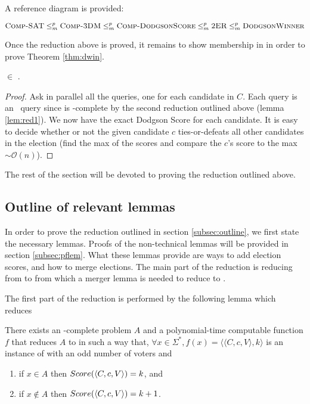 A reference diagram is provided:

\[\text{{\sc Comp-SAT}} \le_m^p \text{{\sc Comp-3DM}} \le_m^p
\text{{\sc Comp-DodgsonScore}} \le_m^p
\text{{\sc 2ER}} \le_m^p \text{{\sc DodgsonWinner}}\]

Once the reduction above is proved, it remains to show membership in \tp in order
to prove Theorem \ref{thm:dwin}.
\begin{theorem} \label{thm:intp}
     $\in$ \tp. \\
\end{theorem}
\begin{proof}
    Ask in parallel all the  queries,
    one for each candidate in $C$.
    Each query is an \np~query since  is \np-complete by
    the second reduction outlined above (lemma \ref{lem:red1}).
    We now have the exact Dodgson Score for each candidate.
    It is easy to decide
    whether or not the given candidate $c$ ties-or-defeats all other candidates in
    the election (find the max of the scores and compare the $c$'s score to
    the max $\sim\mathcal{O}(n)$).
\end{proof}

The rest of the section will be devoted to proving the reduction outlined above.

\subsection{Outline of relevant lemmas}

In order to prove the reduction outlined in section \ref{subsec:outline},
we first state the necessary lemmas.
Proofs of the non-technical lemmas will be provided in section \ref{subsec:pflem}.
What these lemmas provide are ways to add election scores, and how to merge elections.
The main part of the reduction is reducing from \csat to 
from which a merger lemma is needed to reduce to \dwin.

The first part of the reduction is performed by the following lemma which
reduces 

\begin{lemma} \label{lem:red1}
    There exists an \np-complete problem $A$ and a polynomial-time
    computable function $f$ that reduces $A$ to \dscore in such
    a way that, $\forall x \in \Sigma^*,
    f(x) = \langle \langle C,c,V \rangle, k\rangle $
    is an instance of \dscore with an odd number of voters and
    \begin{enumerate}
        \item if $x\in A$ then $Score(\langle C,c,V \rangle) = k$, and
        \item if $x\notin A$ then $Score(\langle C,c,V \rangle) = k+1$.
    \end{enumerate}
\end{lemma}

